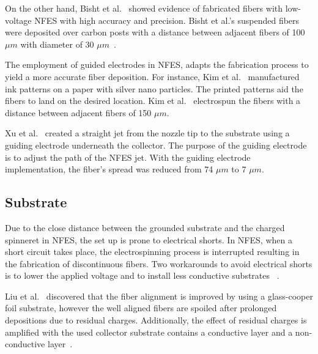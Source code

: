\documentclass[5p,,preprint,12pt,twocolumn]{elsarticle}
\begin{document}
On the other hand, Bisht et al.\unskip~\cite{527120:11973130} showed evidence of fabricated fibers with low-voltage NFES with high accuracy and precision. Bisht et al.'s suspended fibers were deposited over carbon posts with a distance between adjacent fibers of 100 $\mu m $ with diameter of 30 $\mu m $\unskip~\cite{527120:11973130}.

The employment of guided electrodes in NFES, adapts the fabrication process to yield a more accurate fiber deposition. For instance, Kim et al.\unskip~\cite{527120:11974313} manufactured ink patterns on a paper with silver nano particles. The printed patterns aid the fibers to land on the desired location. Kim et al.\unskip~\cite{527120:11974313} electrospun the fibers with a distance between adjacent fibers of 150 $\mu m $.

Xu et al.\unskip~\cite{527120:11974325} created a straight jet from the nozzle tip to the substrate using a guiding electrode underneath the collector. The purpose of the guiding electrode is to adjust the path of the NFES jet. With the guiding electrode implementation, the fiber's spread was reduced from 74 $\mu m $ to 7 $\mu m $.



\subsection{Substrate}Due to the close distance between the grounded substrate and the charged spinneret in NFES, the set up is prone to electrical shorts. In NFES, when a short circuit takes place, the electrospinning process is interrupted resulting in the fabrication of discontinuous fibers. Two workarounds to avoid electrical shorts is to lower the applied voltage and to install less conductive substrates \unskip~\cite{527120:11974315,527120:12322289}.

Liu et al.\unskip~\cite{527120:11974315} discovered that the fiber alignment is improved by using a glass-cooper foil substrate, however the well aligned fibers are spoiled after prolonged depositions due to residual charges. Additionally, the effect of residual charges is amplified with the used collector substrate contains a conductive layer and a non-conductive layer\unskip~\cite{527120:11974315}.
\end{document}

